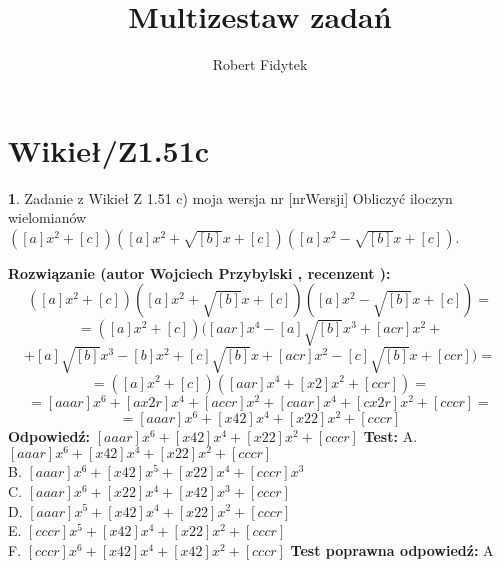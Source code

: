 \documentclass[12pt, a4paper]{article}
\title{Multizestaw zadań}
\author{Robert Fidytek}
\date{}
\theoremstyle{definition} %
\newtheorem{zad}{}
\newcommand{\kategoria}[1]{\section{#1}} %
\newcommand{\zadStart}[1]{\begin{zad}#1\newline} %
\newcommand{\zadStop}{\end{zad}}   %
\newcommand{\rozwStart}[2]{\noindent \textbf{Rozwiązanie (autor #1 , recenzent #2): }\newline} %
\newcommand{\rozwStop}{\newline}                                            %
\newcommand{\odpStart}{\noindent \textbf{Odpowiedź:}\newline}    %
\newcommand{\odpStop}{\newline}                                             %
\newcommand{\testStart}{\noindent \textbf{Test:}\newline} %
\newcommand{\testStop}{\newline} %
\newcommand{\kluczStart}{\noindent \textbf{Test poprawna odpowiedź:}\newline} %
\newcommand{\kluczStop}{\newline} %
\begin{document}
\maketitle


\kategoria{Wikieł/Z1.51c}
\zadStart{Zadanie z Wikieł Z 1.51 c) moja wersja nr [nrWersji]}
Obliczyć iloczyn wielomianów $([a]x^{2}+[c])([a]x^{2}+\sqrt{[b]}x+[c])([a]x^{2}-\sqrt{[b]}x+[c])$.
\zadStop
\rozwStart{Wojciech Przybylski}{}
$$([a]x^{2}+[c])([a]x^{2}+\sqrt{[b]}x+[c])([a]x^{2}-\sqrt{[b]}x+[c])=$$
$$=([a]x^{2}+[c])([aar]x^{4}-[a]\sqrt{[b]}x^{3}+[acr]x^{2}+$$
$$+[a]\sqrt{[b]}x^{3}-[b]x^{2}+[c]\sqrt{[b]}x+[acr]x^{2}-[c]\sqrt{[b]}x+[ccr])=$$
$$=([a]x^{2}+[c])([aar]x^{4}+[x2]x^{2}+[ccr])=$$
$$=[aaar]x^{6}+[ax2r]x^{4}+[accr]x^{2}+[caar]x^{4}+[cx2r]x^{2}+[cccr]=$$
$$=[aaar]x^{6}+[x42]x^{4}+[x22]x^{2}+[cccr]$$
\rozwStop
\odpStart
$[aaar]x^{6}+[x42]x^{4}+[x22]x^{2}+[cccr]$
\odpStop
\testStart
A. $[aaar]x^{6}+[x42]x^{4}+[x22]x^{2}+[cccr]$\\
B. $[aaar]x^{6}+[x42]x^{5}+[x22]x^{4}+[cccr]x^{3}$\\
C. $[aaar]x^{6}+[x22]x^{4}+[x42]x^{3}+[cccr]$\\
D. $[aaar]x^{5}+[x42]x^{4}+[x22]x^{2}+[cccr]$\\
E. $[cccr]x^{5}+[x42]x^{4}+[x22]x^{2}+[cccr]$\\
F. $[cccr]x^{6}+[x42]x^{4}+[x42]x^{2}+[cccr]$
\testStop
\kluczStart
A
\kluczStop
\end{document}
